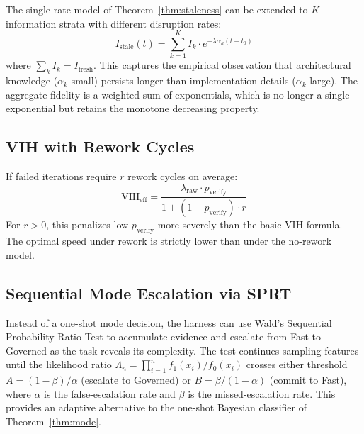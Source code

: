 \documentclass[11pt,a4paper]{article}
\theoremstyle{definition}
\theoremstyle{remark}
\newcommand{\VIH}{\mathrm{VIH}}
\begin{document}
The single-rate model of Theorem~\ref{thm:staleness} can be extended to $K$ information strata with different disruption rates:
\[
    I_{\mathrm{stale}}(t) = \sum_{k=1}^K I_k \cdot e^{-\lambda\alpha_k(t - t_0)}
\]
where $\sum_k I_k = I_{\mathrm{fresh}}$. This captures the empirical observation that architectural knowledge ($\alpha_k$ small) persists longer than implementation details ($\alpha_k$ large). The aggregate fidelity is a weighted sum of exponentials, which is no longer a single exponential but retains the monotone decreasing property.

\subsection{VIH with Rework Cycles}

If failed iterations require $r$ rework cycles on average:
\[
    \VIH_{\mathrm{eff}} = \frac{\lambda_{\mathrm{raw}} \cdot p_{\mathrm{verify}}}{1 + (1 - p_{\mathrm{verify}}) \cdot r}
\]
For $r > 0$, this penalizes low $p_{\mathrm{verify}}$ more severely than the basic VIH formula. The optimal speed under rework is strictly lower than under the no-rework model.

\subsection{Sequential Mode Escalation via SPRT}

Instead of a one-shot mode decision, the harness can use Wald's Sequential Probability Ratio Test to accumulate evidence and escalate from Fast to Governed as the task reveals its complexity. The test continues sampling features until the likelihood ratio $\Lambda_n = \prod_{i=1}^n f_1(x_i)/f_0(x_i)$ crosses either threshold $A = (1 - \beta)/\alpha$ (escalate to Governed) or $B = \beta/(1-\alpha)$ (commit to Fast), where $\alpha$ is the false-escalation rate and $\beta$ is the missed-escalation rate. This provides an adaptive alternative to the one-shot Bayesian classifier of Theorem~\ref{thm:mode}.



\end{document}
